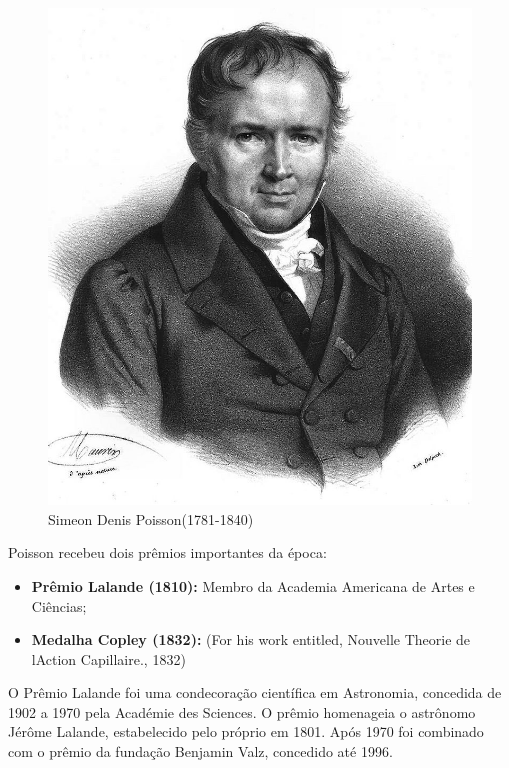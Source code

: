 \vspace{-1.69cm}
\begin{figure}
    \centering
\includegraphics[scale=0.2]{figures/Simeon_Poisson.jpeg}
    \caption{Simeon Denis Poisson(1781-1840)}
    \label{fig:my_label4}
\end{figure}


Poisson recebeu dois prêmios importantes da época:

\begin{itemize}
    \item \textbf{Prêmio Lalande (1810):} Membro da Academia Americana de Artes e Ciências;
    \item \textbf{Medalha Copley (1832):} (For his work entitled, Nouvelle Theorie de lAction Capillaire., 1832)
\end{itemize}

O Prêmio Lalande foi uma condecoração científica em Astronomia, concedida de 1902 a 1970 pela Académie des Sciences. O prêmio homenageia o astrônomo Jérôme Lalande, estabelecido pelo próprio em 1801. Após 1970 foi combinado com o prêmio da fundação Benjamin Valz, concedido até 1996.\vskip0.3cm



